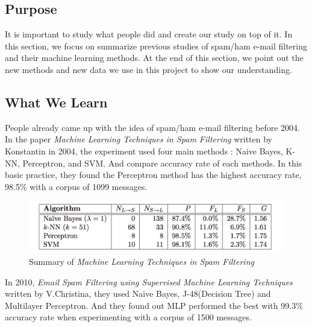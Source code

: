 
\subsection{Purpose}

It is important to study what people did and create our study on top of it. In this section, we focus on summarize previous studies of spam/ham e-mail filtering and their machine learning methods. At the end of this section, we point out the new methods and new data we use in this project to show our understanding.  \\

\subsection{What We Learn}
People already came up with the idea of spam/ham e-mail filtering before 2004. In the paper \textit{Machine Learning Techniques in Spam Filtering} written by Konstantin in 2004\cite{MLinspam}, the experiment used four main methods : Naive Bayes, K-NN, Perceptron, and SVM. And compare accuracy rate of each methods. In this basic practice, they found the Perceptron method has the highest accuracy rate, 98.5\% with a corpus of 1099 messages. \\

\begin{figure}[H]
	\centering
	\includegraphics[scale=1.0, width=\linewidth]{./plots/2004.png}
	\caption{Summary of \textit{Machine Learning Techniques in Spam Filtering\cite{MLinspam}}}
	\label{paper_summary_2004}
\end{figure}

In 2010, \textit{Email Spam Filtering using Supervised Machine Learning Techniques } written by V.Christina\cite{EmailMLT}, they used Naive Bayes, J-48(Decision Tree) and Multilayer Perceptron. And they found out MLP performed the best with 99.3\% accuracy rate when experimenting with a corpus of 1500 messages.\\

